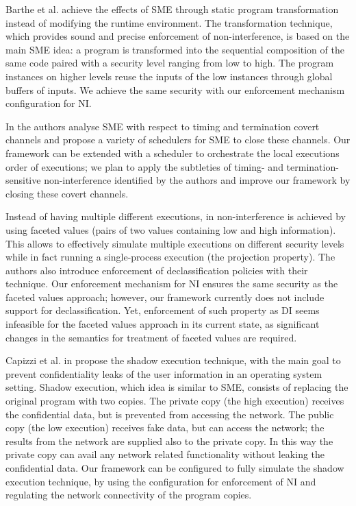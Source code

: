 \documentclass[10pt,a4paper,oneside]{article}
\begin{document}
Barthe et al. \cite{Bart-Crespo-FMOODS-2012} achieve the effects of SME through static program transformation instead of modifying the runtime environment. The transformation technique, which provides sound and precise enforcement of non-interference, is based on the main SME idea: a program is transformed into the sequential composition of the same code paired with a security level ranging from low to high. The program instances on higher levels reuse the inputs of the low instances through global buffers of inputs. We achieve the same security with our enforcement mechanism configuration for NI.

In \cite{Kash-Wied-Hard-11-SSP} the authors analyse SME with respect to timing and termination covert channels and propose a variety of schedulers for SME to close these channels. Our framework can be extended with a scheduler to orchestrate the local executions order of executions; we plan to apply the subtleties of timing- and termination-sensitive non-interference identified by the authors and improve our framework by closing these covert channels.



Instead of having multiple different executions, in \cite{Aust-Flan-12-POPL} non-interference is achieved by using faceted values (pairs of two values containing low and high information). This allows to effectively simulate multiple executions on different security levels while in fact running a single-process execution (the projection property).   The authors also introduce enforcement of declassification policies with their technique. Our enforcement mechanism for NI ensures the same security as the faceted values approach; however, our framework currently does not include support for declassification. Yet, enforcement of such property as DI seems infeasible for the faceted values approach in its current state, as significant changes in the semantics for treatment of faceted values are required. 

Capizzi et al. in \cite{Capi-Long-Venk-08-ACSAC} propose the shadow execution technique, with the main goal to prevent confidentiality leaks of the user information in an operating system setting. Shadow execution, which idea is similar to SME, consists of replacing the original program with two copies. The private copy (the high execution) receives the confidential data, but is prevented from accessing the network. The public copy (the low execution) receives fake data, but can access the network; the results from the network are supplied also to the private copy. In this way the private copy can avail any network related functionality without leaking the confidential data. Our framework can be configured to fully simulate the shadow execution technique, by using the configuration for enforcement of NI and regulating the network connectivity of the program copies.
\end{document}
